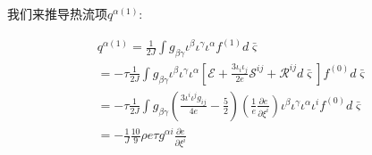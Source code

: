 \documentclass[MathematicsNumericsDerivationsAndOpenFOAM.tex]{subfiles}
\begin{document}
我们来推导热流项$q^{\alpha (1)}$:


\begin{equation}
  \begin{gathered}
    q^{\alpha (1)} =  \frac{1}{2J}\int g_{\beta\gamma} \iota^{\beta} \iota^{\gamma}  \iota^{\alpha} f^{(1)}  d \bar{\varsigma}\\
    = -\tau  \frac{1}{2J}\int g_{\beta\gamma} \iota^{\beta} \iota^{\gamma}  \iota^{\alpha}  [ \mathcal{E}
      +\frac{3\iota_i \iota_j}{2e} \mathcal{S}^{ij}
      +  \mathcal{R}^{ij}  d \bar{\varsigma}
    ]{f^{(0)}} d \bar{\varsigma} \\
    = -\tau  \frac{1}{2J} \int g_{\beta\gamma} (\frac{3 {\iota^i\iota^jg_{ij}}}{4e}-\frac{5}{2}) (\frac{1}{e}\frac{\partial e}{\partial \xi^i})\iota^{\beta} \iota^{\gamma}  \iota^{\alpha} \iota^i   f^{(0)}  d \bar{\varsigma} \\
    = -\frac{1}{J}\frac{10}{9}\rho e \tau g^{\alpha i}\frac{\partial e}{\partial \xi^i}
  \end{gathered}
\end{equation}











\end{document}
